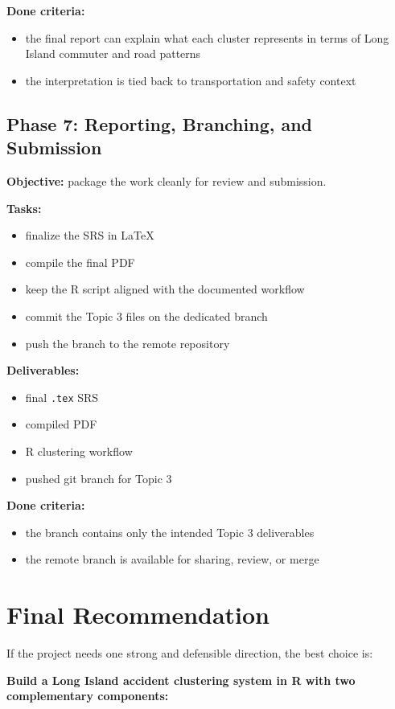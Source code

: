 \documentclass[11pt]{article}
\begin{document}
\textbf{Done criteria:}
\begin{itemize}
\item the final report can explain what each cluster represents in terms of Long Island commuter and road patterns
\item the interpretation is tied back to transportation and safety context
\end{itemize}

\subsection{Phase 7: Reporting, Branching, and Submission}

\textbf{Objective:} package the work cleanly for review and submission.

\textbf{Tasks:}
\begin{itemize}
\item finalize the SRS in \LaTeX
\item compile the final PDF
\item keep the R script aligned with the documented workflow
\item commit the Topic 3 files on the dedicated branch
\item push the branch to the remote repository
\end{itemize}

\textbf{Deliverables:}
\begin{itemize}
\item final \texttt{.tex} SRS
\item compiled PDF
\item R clustering workflow
\item pushed git branch for Topic 3
\end{itemize}

\textbf{Done criteria:}
\begin{itemize}
\item the branch contains only the intended Topic 3 deliverables
\item the remote branch is available for sharing, review, or merge
\end{itemize}

\section{Final Recommendation}

If the project needs one strong and defensible direction, the best choice is:

\begin{center}
\textbf{Build a Long Island accident clustering system in R with two complementary components:}
\end{center}
\end{document}
